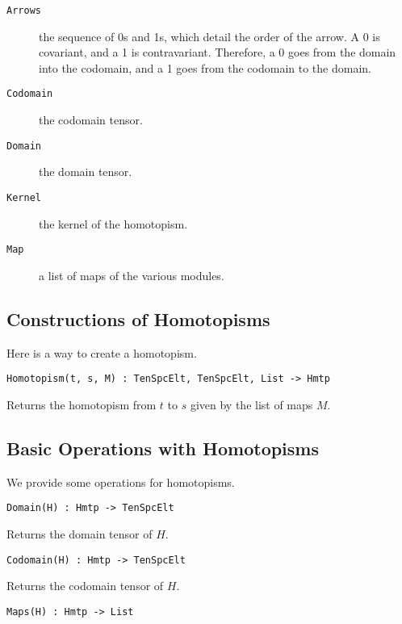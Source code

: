 \documentclass{amsart}
\begin{document}
\begin{description}
\item[{\tt Arrows}] the sequence of 0s and 1s, which detail the order of the
arrow. A 0 is covariant, and a 1 is contravariant. Therefore, a 0 goes from the 
domain into the codomain, and a 1 goes from the codomain to the domain.
\item[{\tt Codomain}] the codomain tensor.
\item[{\tt Domain}] the domain tensor.
\item[{\tt Kernel}] the kernel of the homotopism.
\item[{\tt Map}] a list of maps of the various modules.
\end{description}

\subsection{Constructions of Homotopisms}

Here is a way to create a homotopism. %

\color{blue}
{\small \begin{verbatim}
Homotopism(t, s, M) : TenSpcElt, TenSpcElt, List -> Hmtp
\end{verbatim} }
\color{black}

Returns the homotopism from $t$ to $s$ given by the list of maps $M$.

\subsection{Basic Operations with Homotopisms}

We provide some operations for homotopisms.

\color{blue}
{\small \begin{verbatim}
Domain(H) : Hmtp -> TenSpcElt
\end{verbatim} }
\color{black}

Returns the domain tensor of $H$.

\color{blue}
{\small \begin{verbatim}
Codomain(H) : Hmtp -> TenSpcElt
\end{verbatim} }
\color{black}

Returns the codomain tensor of $H$.

\color{blue}
{\small \begin{verbatim}
Maps(H) : Hmtp -> List
\end{verbatim} }
\color{black}
\end{document}
